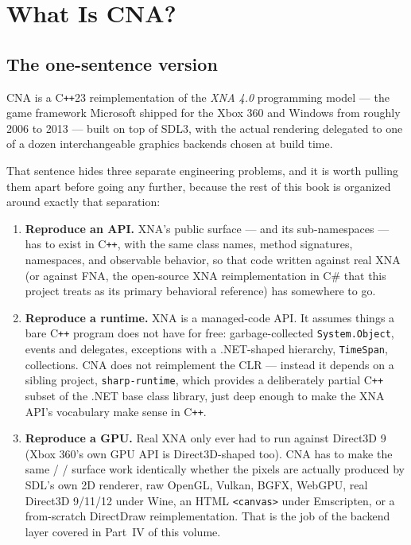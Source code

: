 \chapter{What Is CNA?}
\label{ch:what-is-cna}

\section{The one-sentence version}

CNA is a C\texttt{++}23 reimplementation of the \emph{XNA 4.0} programming model --- the
game framework Microsoft shipped for the Xbox 360 and Windows from roughly 2006 to 2013 ---
built on top of SDL3, with the actual rendering delegated to one of a dozen interchangeable
graphics backends chosen at build time.

That sentence hides three separate engineering problems, and it is worth pulling them
apart before going any further, because the rest of this book is organized around exactly
that separation:

\begin{enumerate}
  \item \textbf{Reproduce an API.} XNA's public surface --- 
        and its sub-namespaces --- has to exist in C\texttt{++}, with the same class names,
        method signatures, namespaces, and observable behavior, so that code written against
        real XNA (or against FNA, the open-source XNA reimplementation in C\# that this
        project treats as its primary behavioral reference) has somewhere to go.
  \item \textbf{Reproduce a runtime.} XNA is a managed-code API. It assumes things a bare
        C\texttt{++} program does not have for free: garbage-collected \texttt{System.Object},
        events and delegates, exceptions with a .NET-shaped hierarchy, \texttt{TimeSpan},
        collections. CNA does not reimplement the CLR --- instead it depends on a sibling
        project, \texttt{sharp-runtime}, which provides a deliberately partial C\texttt{++}
        subset of the .NET base class library, just deep enough to make the XNA API's
        vocabulary make sense in C\texttt{++}.
  \item \textbf{Reproduce a GPU.} Real XNA only ever had to run against Direct3D 9 (Xbox 360's
        own GPU API is Direct3D-shaped too). CNA has to make the same 
        / /  surface work identically whether the pixels
        are actually produced by SDL's own 2D renderer, raw OpenGL, Vulkan, BGFX, WebGPU, real
        Direct3D 9/11/12 under Wine, an HTML \texttt{<canvas>} under Emscripten, or a
        from-scratch DirectDraw reimplementation. That is the job of the backend layer covered
        in Part~IV of this volume.
\end{enumerate}

